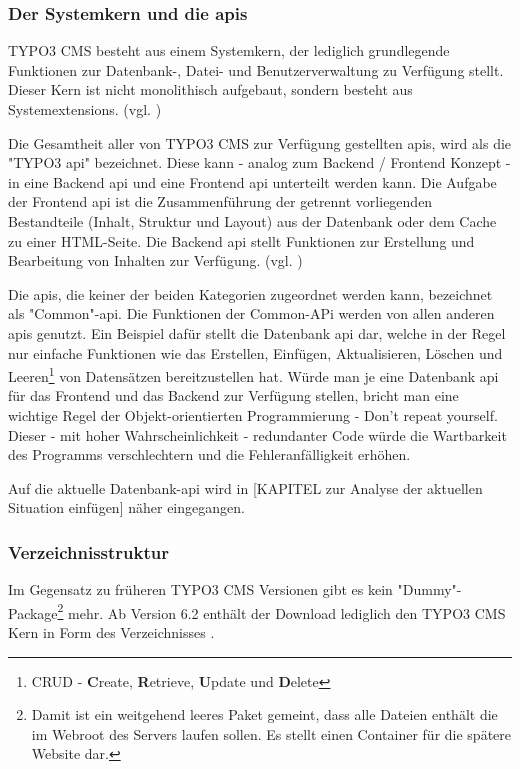 

\subsubsection{Der Systemkern und die \gls{api}s}
TYPO3 CMS besteht aus einem Systemkern, der lediglich grundlegende Funktionen zur Datenbank-, Datei- und Benutzerverwaltung zu Verfügung stellt. Dieser Kern ist nicht monolithisch aufgebaut, sondern besteht aus Systemextensions. (vgl. \cite[S. 32]{book:laborenzTypo32006})

Die Gesamtheit aller von TYPO3 CMS zur Verfügung gestellten \gls{api}s, wird als die "TYPO3 \gls{api}" bezeichnet. Diese kann - analog zum Backend / Frontend Konzept - in eine Backend \gls{api} und eine Frontend \gls{api} unterteilt werden kann. Die Aufgabe der Frontend \gls{api} ist die Zusammenführung der getrennt vorliegenden Bestandteile (Inhalt, Struktur und Layout) aus der Datenbank oder dem Cache zu einer HTML-Seite. Die Backend \gls{api} stellt Funktionen zur Erstellung und Bearbeitung von Inhalten zur Verfügung. (vgl. \cite[S. 5 ff.]{book:dulepovTypo32008})

Die \gls{api}s, die keiner der beiden Kategorien zugeordnet werden kann, bezeichnet \cite[S. 5 ff.]{book:dulepovTypo32008} als "Common"-\gls{api}. Die Funktionen der Common-APi werden von allen anderen \gls{api}s genutzt. Ein Beispiel dafür stellt die Datenbank \gls{api} dar, welche in der Regel nur einfache Funktionen wie das Erstellen, Einfügen, Aktualisieren, Löschen und Leeren\footnote{CRUD - {\bfseries C}reate, {\bfseries R}etrieve, {\bfseries U}pdate und {\bfseries D}elete} von Datensätzen bereitzustellen hat. Würde man je eine Datenbank \gls{api} für das Frontend und das Backend zur Verfügung stellen, bricht man eine wichtige Regel der Objekt-orientierten Programmierung - Don't repeat yourself. Dieser - mit hoher Wahrscheinlichkeit - redundanter Code würde die Wartbarkeit des Programms verschlechtern und die Fehleranfälligkeit erhöhen.

Auf die aktuelle Datenbank-\gls{api} wird in [KAPITEL zur Analyse der aktuellen Situation einfügen] näher eingegangen.

\subsubsection{Verzeichnisstruktur}

Im Gegensatz zu früheren TYPO3 CMS Versionen gibt es kein "Dummy"-Package\footnote{Damit ist ein weitgehend leeres Paket gemeint, dass alle Dateien enthält die im Web\-root des Servers laufen sollen. Es stellt einen Container für die spätere Website dar.} mehr. Ab Version 6.2 enthält der Download lediglich den TYPO3 CMS Kern in Form des Verzeichnisses .

